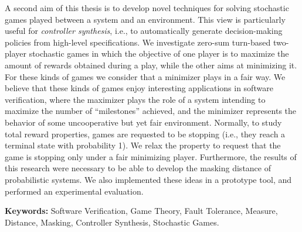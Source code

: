 A second aim of this thesis is to develop novel techniques for solving stochastic games played between a system and an environment. This view is particularly useful for \emph{controller synthesis}, i.e., to automatically generate decision-making policies from high-level specifications.
We investigate zero-sum turn-based two-player stochastic games in which the objective of one player is to maximize the amount of rewards obtained during a play, while the other aims at minimizing it. %
For these kinds of games we consider that a minimizer plays in a 
fair way. We believe that these kinds of games enjoy interesting applications in software verification, where the maximizer plays the role of a system intending to maximize the
number of  ``milestones'' achieved, and the minimizer represents the behavior of some uncooperative but yet fair environment.
Normally, to study total reward properties, games are requested to be stopping (i.e., they reach a terminal state with probability 1).  %
We relax the property to request that the game is stopping only under a fair minimizing player. Furthermore, the results of this research were necessary to be able to develop the masking distance of probabilistic systems. We also implemented these ideas in a prototype tool,  and performed an experimental evaluation.



\noindent
\textbf{Keywords:} Software Verification, Game Theory, Fault Tolerance, Measure, Distance, Masking, Controller Synthesis, Stochastic Games.